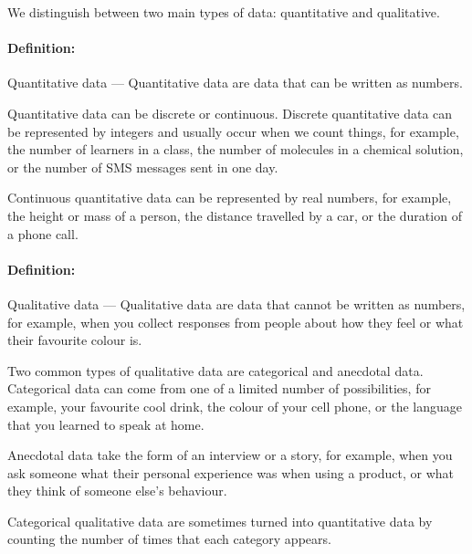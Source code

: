 \documentclass[a4paper,11pt]{report}
\def\Definition#1#2{\paragraph{Definition:} #1 --- #2}
\begin{document}
We distinguish between two main types of data: quantitative and
qualitative.

\Definition{Quantitative data}{Quantitative data are data that can be
  written as numbers.}

Quantitative data can be discrete or continuous. Discrete quantitative
data can be represented by integers and usually occur when we count
things, for example, the number of learners in a class, the number of
molecules in a chemical solution, or the number of SMS messages sent
in one day.

Continuous quantitative data can be represented by real numbers, for
example, the height or mass of a person, the distance travelled by a
car, or the duration of a phone call.

\Definition{Qualitative data}{Qualitative data are data that cannot be
  written as numbers, for example, when you collect responses from
  people about how they feel or what their favourite colour is.}

Two common types of qualitative data are categorical and anecdotal
data. Categorical data can come from one of a limited number of
possibilities, for example, your favourite cool drink, the colour of
your cell phone, or the language that you learned to speak at home.

Anecdotal data take the form of an interview or a story, for example,
when you ask someone what their personal experience was when using a
product, or what they think of someone else's behaviour.

Categorical qualitative data are sometimes turned into quantitative
data by counting the number of times that each category appears.
\end{document}
